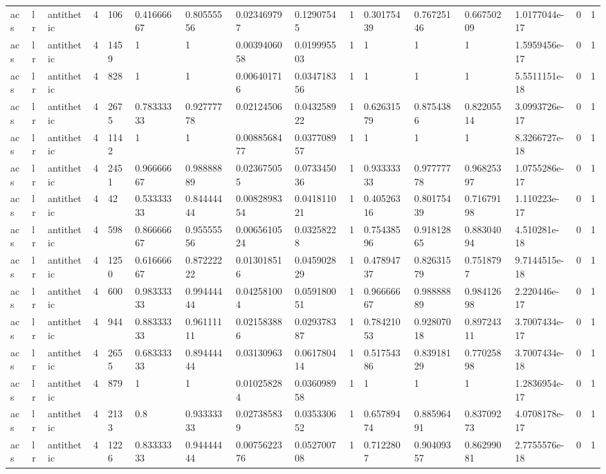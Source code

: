 \begin{tabular}{llllllllllllllll}
acs & lr & antithetic & 4 & 106 & 0.41666667 & 0.80555556 & 0.023469797 & 0.12907545 & 1 & 0.30175439 & 0.76725146 & 0.66750209 & 1.0177044e-17 & 0 & 1 \\
acs & lr & antithetic & 4 & 1459 & 1 & 1 & 0.0039406058 & 0.019995503 & 1 & 1 & 1 & 1 & 1.5959456e-17 & 0 & 1 \\
acs & lr & antithetic & 4 & 828 & 1 & 1 & 0.006401716 & 0.034718356 & 1 & 1 & 1 & 1 & 5.5511151e-18 & 0 & 1 \\
acs & lr & antithetic & 4 & 2675 & 0.78333333 & 0.92777778 & 0.02124506 & 0.043258922 & 1 & 0.62631579 & 0.8754386 & 0.82205514 & 3.0993726e-17 & 0 & 1 \\
acs & lr & antithetic & 4 & 1142 & 1 & 1 & 0.0088568477 & 0.037708957 & 1 & 1 & 1 & 1 & 8.3266727e-18 & 0 & 1 \\
acs & lr & antithetic & 4 & 2451 & 0.96666667 & 0.98888889 & 0.023675055 & 0.073345036 & 1 & 0.93333333 & 0.97777778 & 0.96825397 & 1.0755286e-17 & 0 & 1 \\
acs & lr & antithetic & 4 & 42 & 0.53333333 & 0.84444444 & 0.0082898354 & 0.041811021 & 1 & 0.40526316 & 0.80175439 & 0.71679198 & 1.110223e-17 & 0 & 1 \\
acs & lr & antithetic & 4 & 598 & 0.86666667 & 0.95555556 & 0.0065610524 & 0.03258228 & 1 & 0.75438596 & 0.91812865 & 0.88304094 & 4.510281e-18 & 0 & 1 \\
acs & lr & antithetic & 4 & 1250 & 0.61666667 & 0.87222222 & 0.013018516 & 0.045902829 & 1 & 0.47894737 & 0.82631579 & 0.7518797 & 9.7144515e-18 & 0 & 1 \\
acs & lr & antithetic & 4 & 600 & 0.98333333 & 0.99444444 & 0.042581004 & 0.059180051 & 1 & 0.96666667 & 0.98888889 & 0.98412698 & 2.220446e-17 & 0 & 1 \\
acs & lr & antithetic & 4 & 944 & 0.88333333 & 0.96111111 & 0.021583886 & 0.029378387 & 1 & 0.78421053 & 0.92807018 & 0.89724311 & 3.7007434e-17 & 0 & 1 \\
acs & lr & antithetic & 4 & 2655 & 0.68333333 & 0.89444444 & 0.03130963 & 0.061780414 & 1 & 0.51754386 & 0.83918129 & 0.77025898 & 3.7007434e-18 & 0 & 1 \\
acs & lr & antithetic & 4 & 879 & 1 & 1 & 0.010258284 & 0.036098958 & 1 & 1 & 1 & 1 & 1.2836954e-17 & 0 & 1 \\
acs & lr & antithetic & 4 & 2133 & 0.8 & 0.93333333 & 0.027385839 & 0.035330652 & 1 & 0.65789474 & 0.88596491 & 0.83709273 & 4.0708178e-17 & 0 & 1 \\
acs & lr & antithetic & 4 & 1226 & 0.83333333 & 0.94444444 & 0.0075622376 & 0.052700708 & 1 & 0.7122807 & 0.90409357 & 0.86299081 & 2.7755576e-18 & 0 & 1 \\

\end{tabular}
